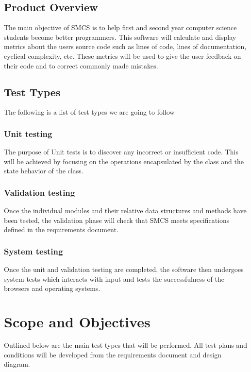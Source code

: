 \documentclass{scrreprt}
\begin{document}
	\section{Product Overview}
	The main objective of SMCS is to help first and second year computer science students become better programmers.
	This software will calculate and display metrics about the users source code such as lines of code, lines of documentation, cyclical complexity, etc.
	These metrics will be used to give the user feedback on their code and to correct commonly made mistakes.
	
	\section{Test Types}
	The following is a list of test types we are going to follow
	\subsection{Unit testing}
	The purpose of Unit tests is to discover any incorrect or insufficient code. This will be achieved by focusing on the operations encapsulated by the class and the state behavior of the class.
	\subsection{Validation testing}
	Once the individual modules and their relative data structures and methods have been tested, the validation phase will check that SMCS meets specifications defined in the requirements document.
	\subsection{System testing}
	Once the unit and validation testing are completed, the software then undergoes system tests which interacts with input and tests the successfulness of the browsers and operating systems. 
	
	{\let\clearpage\relax \chapter{Scope and Objectives}}
	Outlined below are the main test types that will be performed. All test plans and conditions will be developed from the requirements document and design diagram.
	
\end{document}
